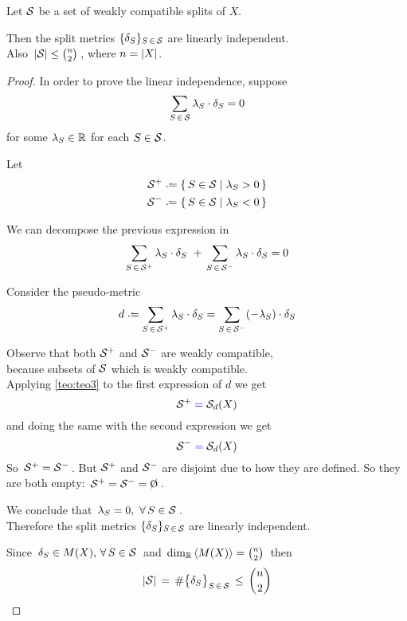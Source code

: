 \documentclass[./main.tex]{subfiles}
\begin{document}
\begin{corollary}[{\cites[Corollary 4]{BD92a}}] \label{cor:cor4}
    Let ${\mathcal{S}}$ be a set of weakly compatible splits of $X$.

    Then the split metrics $\{\delta_S\}_{S \,\in\, {\mathcal{S}}}$ are linearly independent. \\[2pt]
    Also $\, \left\lvert{\mathcal{S}}\right\rvert \leq \binom{n}{2} \,$, where $n = \left\lvert X\right\rvert$.
\end{corollary}
\begin{proof}
    In order to prove the linear independence, suppose
    \[ \sum_{S \,\in\, {\mathcal{S}}} \lambda_S \cdot \delta_S = 0 \]
    for some $\lambda_S \in \mathbb{R}$ for each $S \in {\mathcal{S}}$.

    Let
    \begingroup \nospabv
    \begin{align*}
        \Sc^+ &\defeq \{\, S \in \Sc \mid \lambda_S > 0 \,\} \\
        \Sc^- &\defeq \{\, S \in \Sc \mid \lambda_S < 0 \,\}
    \end{align*}
    \endgroup

    We can decompose the previous expression in
    \[ \sum_{S \,\in\, \Sc^+} \lambda_S \cdot \delta_S \ +\, \sum_{S \,\in\, \Sc^-} \lambda_S \cdot \delta_S = 0 \]

    Consider the pseudo-metric
    \[ d \defeq \sum_{S \,\in\, \Sc^+} \lambda_S \cdot \delta_S = \sum_{S \,\in\, \Sc^-} (- \lambda_S) \cdot \delta_S \]

    Observe that both ${\mathcal{S}}^+$ and ${\mathcal{S}}^-$ are weakly compatible, \\
    \bsp because subsets of ${\mathcal{S}}$ which is weakly compatible. \\
    Applying \autoref{teo:teo3} to the first expression of $d$ we get
    \[ \Sc^+ \mathcolor{blue}{=} \Sc_d(X) \]
    and doing the same with the second expression we get
    \[ \Sc^- \mathcolor{blue}{=} \Sc_d(X) \]
    So $\, {\mathcal{S}}^+ = {\mathcal{S}}^- \,$.
    But ${\mathcal{S}}^+$ and ${\mathcal{S}}^-$ are disjoint due to how they are defined.
    So they are both empty: $\, \Sc^+ = \Sc^- = \emptyset \,$.

    We conclude that $\, \lambda_S = 0,\ \forall\, S \in \Sc \,$. \\
    Therefore the split metrics $\{\delta_S\}_{S \,\in\, {\mathcal{S}}}$ are linearly independent. \bigskip

    Since $\, \delta_S \in M(X),\, \forall\, S \in {\mathcal{S}} \,$ and $\, \dim_{\mathbb{R}} \left\langle M(X)\right\rangle = \binom{n}{2} \,$ then
    \[ \left\lvert{\mathcal{S}}\right\rvert \,=\, \# \bigl\{ \delta_S \bigr\}_{S \,\in\, {\mathcal{S}}} \,\leq\, \binom{n}{2} \]
\end{proof}
\end{document}
